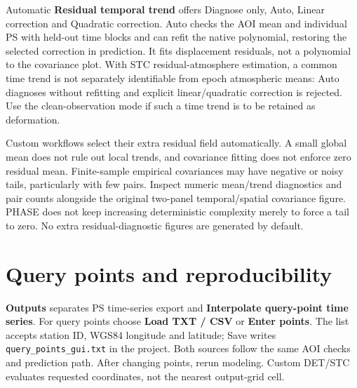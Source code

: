 Automatic \textbf{Residual temporal trend} offers Diagnose only, Auto, Linear correction and Quadratic correction. Auto checks the AOI mean and individual PS with held-out time blocks and can refit the native polynomial, restoring the selected correction in prediction. It fits displacement residuals, not a polynomial to the covariance plot. With STC residual-atmosphere estimation, a common time trend is not separately identifiable from epoch atmospheric means: Auto diagnoses without refitting and explicit linear/quadratic correction is rejected. Use the clean-observation mode if such a time trend is to be retained as deformation.

Custom workflows select their extra residual field automatically. A small global mean does not rule out local trends, and covariance fitting does not enforce zero residual mean. Finite-sample empirical covariances may have negative or noisy tails, particularly with few pairs. Inspect numeric mean/trend diagnostics and pair counts alongside the original two-panel temporal/spatial covariance figure. PHASE does not keep increasing deterministic complexity merely to force a tail to zero. No extra residual-diagnostic figures are generated by default.

\section{Query points and reproducibility}\label{sec:custom-outputs}
\textbf{Outputs} separates PS time-series export and \textbf{Interpolate query-point time series}. For query points choose \textbf{Load TXT / CSV} or \textbf{Enter points}. The list accepts station ID, WGS84 longitude and latitude; Save writes \texttt{query\_points\_gui.txt} in the project. Both sources follow the same AOI checks and prediction path. After changing points, rerun modeling. Custom DET/STC evaluates requested coordinates, not the nearest output-grid cell.

